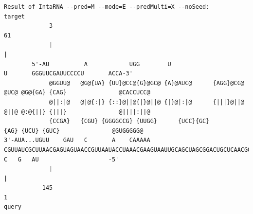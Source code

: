 \documentclass[11pt,a4paper]{report}
\begin{document}
\begin{landscape}
\begin{lstlisting}[style=special]
Result of IntaRNA --pred=M --mode=E --predMulti=X --noSeed:
target
             3                                                                                                                                                            61
             |                                                                                                                                                            |
        5'-AU          A            UGG        U                                                                                             U       GGGUUCGAUUCCCCU       ACCA-3'
             @GGUU@   @G@{UA} {UU}@CC@{G}@GC@ {A}@AUC@      {AGG}@CG@                                                                                            @UC@ @G@{GA} {CAG}               @CACCUCC@
             @||:|@   @|@{:|} {::}@||@{|}@||@ {|}@|:|@      {|||}@||@                                                                                            @||@ @:@{||} {|||}               @||||:||@
             {CCGA}   {CGU} {GGGGCCG} {UUGG}      {UCC}{GC}                                                                                            {AG} {UCU} {GUC}               @GUGGGGG@
3'-AUA...UGUU    GAU   C       A    CAAAAA     CGUUAUCGCUUAACGAGUAGUAACCGUUAAUACCUAAACGAAGUAAUUGCAGCUAGCGGACUGCUCAACGGACGCGUGGAAACAGGCGGGAC  C   G   AU                    -5'
             |                                                                                                                                                            |
           145                                                                                                                                                            1
query



\end{lstlisting}
\end{landscape}
\end{document}
